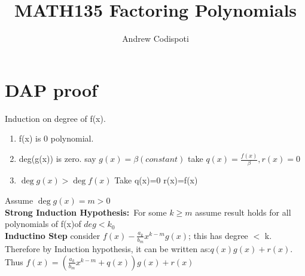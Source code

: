 \documentclass{article}
\begin{document}
\title{MATH135 Factoring Polynomials}
\author{Andrew Codispoti}
\maketitle
\section{DAP proof}
Induction on degree of f(x).
\\
\begin{enumerate}
\item f(x) is 0 polynomial. 
\item deg(g(x)) is zero. say $g(x)=\beta (constant)$ take $q(x)=\frac{f(x)}{\beta}, r(x)=0$
\item $\deg{g(x)}> \deg{f(x)}$ Take q(x)=0 r(x)=f(x)
\end{enumerate}
Assume $\deg{g(x)}=m>0$\\
\textbf{Strong Induction Hypothesis:}\ For some $k\geq m $ assume result holds for all polynomials of f(x)of $deg< k_0$
\\
\textbf{Inductino Step }
consider $f(x)-\frac{a_k}{b_m}x^{k-m}g(x)$; this has degree $<$ k. Therefore by Induction hypothesis, it can be written as:$q(x)g(x)+r(x)$. Thus $f(x)=(\frac{a_k}{b_m}x^{k-m} +q(x))g(x)+r(x)$
\end{document}
